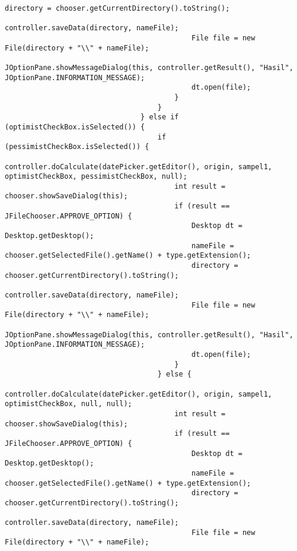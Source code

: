 \begin{lstlisting}[caption= main.java]
                                            directory = chooser.getCurrentDirectory().toString();
                                            controller.saveData(directory, nameFile);
                                            File file = new File(directory + "\\" + nameFile);
                                            JOptionPane.showMessageDialog(this, controller.getResult(), "Hasil", JOptionPane.INFORMATION_MESSAGE);
                                            dt.open(file);
                                        }
                                    }
                                } else if (optimistCheckBox.isSelected()) {
                                    if (pessimistCheckBox.isSelected()) {
                                        controller.doCalculate(datePicker.getEditor(), origin, sampel1, optimistCheckBox, pessimistCheckBox, null);
                                        int result = chooser.showSaveDialog(this);
                                        if (result == JFileChooser.APPROVE_OPTION) {
                                            Desktop dt = Desktop.getDesktop();
                                            nameFile = chooser.getSelectedFile().getName() + type.getExtension();
                                            directory = chooser.getCurrentDirectory().toString();
                                            controller.saveData(directory, nameFile);
                                            File file = new File(directory + "\\" + nameFile);
                                            JOptionPane.showMessageDialog(this, controller.getResult(), "Hasil", JOptionPane.INFORMATION_MESSAGE);
                                            dt.open(file);
                                        }
                                    } else {
                                        controller.doCalculate(datePicker.getEditor(), origin, sampel1, optimistCheckBox, null, null);
                                        int result = chooser.showSaveDialog(this);
                                        if (result == JFileChooser.APPROVE_OPTION) {
                                            Desktop dt = Desktop.getDesktop();
                                            nameFile = chooser.getSelectedFile().getName() + type.getExtension();
                                            directory = chooser.getCurrentDirectory().toString();
                                            controller.saveData(directory, nameFile);
                                            File file = new File(directory + "\\" + nameFile);

\end{lstlisting}
